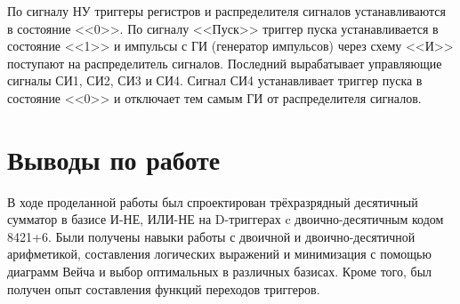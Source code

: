 \documentclass[a4paper,14pt]{article}
\begin{document}
По сигналу НУ триггеры регистров и распределителя сигналов
устанавливаются в состояние <<0>>. По сигналу <<Пуск>> триггер пуска
устанавливается в состояние <<1>> и импульсы с ГИ (генератор импульсов)
через схему <<И>> поступают на распределитель сигналов. Последний
вырабатывает управляющие сигналы СИ1, СИ2, СИ3 и СИ4. Сигнал СИ4
устанавливает триггер пуска в состояние <<0>> и отключает тем самым ГИ от
распределителя сигналов.


\section{Выводы по работе}

В ходе проделанной работы был спроектирован трёхразрядный десятичный сумматор в базисе И-НЕ, ИЛИ-НЕ на D-триггерах c двоично-десятичным кодом 8421+6. 
Были получены навыки работы с двоичной и двоично-десятичной арифметикой, составления логических выражений и минимизация с помощью диаграмм Вейча и выбор оптимальных в различных базисах.
Кроме того, был получен опыт составления функций переходов триггеров.
\end{document}

